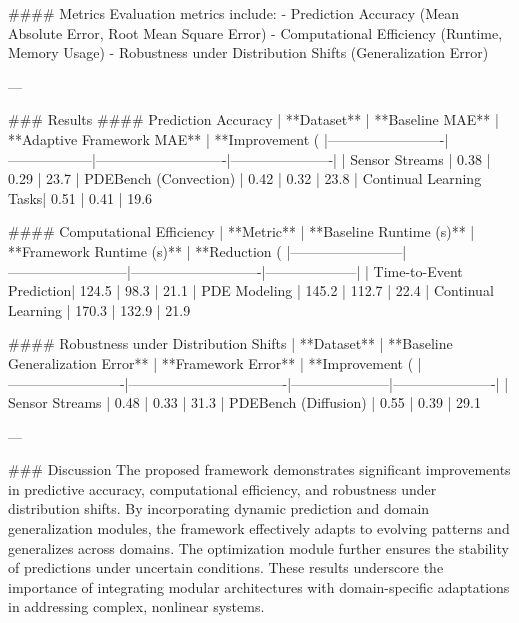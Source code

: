 #### Metrics
Evaluation metrics include:
- Prediction Accuracy (Mean Absolute Error, Root Mean Square Error)
- Computational Efficiency (Runtime, Memory Usage)
- Robustness under Distribution Shifts (Generalization Error)

---

### Results
#### Prediction Accuracy
| **Dataset**            | **Baseline MAE** | **Adaptive Framework MAE** | **Improvement (%
|-------------------------|------------------|----------------------------|----------------------|
| Sensor Streams          | 0.38            | 0.29                       | 23.7%
| PDEBench (Convection)   | 0.42            | 0.32                       | 23.8%
| Continual Learning Tasks| 0.51            | 0.41                       | 19.6%

#### Computational Efficiency
| **Metric**             | **Baseline Runtime (s)** | **Framework Runtime (s)** | **Reduction (%
|------------------------|--------------------------|----------------------------|--------------------|
| Time-to-Event Prediction| 124.5                   | 98.3                       | 21.1%
| PDE Modeling            | 145.2                   | 112.7                      | 22.4%
| Continual Learning      | 170.3                   | 132.9                      | 21.9%

#### Robustness under Distribution Shifts
| **Dataset**            | **Baseline Generalization Error** | **Framework Error** | **Improvement (%
|-------------------------|----------------------------------|---------------------|----------------------|
| Sensor Streams          | 0.48                           | 0.33                | 31.3%
| PDEBench (Diffusion)    | 0.55                           | 0.39                | 29.1%

---

### Discussion
The proposed framework demonstrates significant improvements in predictive accuracy, computational efficiency, and robustness under distribution shifts. By incorporating dynamic prediction and domain generalization modules, the framework effectively adapts to evolving patterns and generalizes across domains. The optimization module further ensures the stability of predictions under uncertain conditions. These results underscore the importance of integrating modular architectures with domain-specific adaptations in addressing complex, nonlinear systems.

